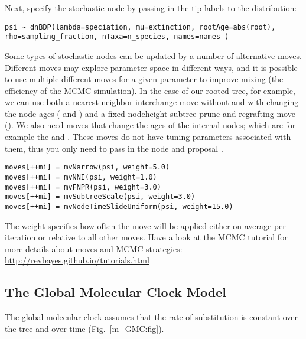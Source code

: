 Next, specify the  stochastic node by passing in the tip labels  to the  distribution:
{\tt \begin{snugshade*}
\begin{lstlisting}
psi ~ dnBDP(lambda=speciation, mu=extinction, rootAge=abs(root), rho=sampling_fraction, nTaxa=n_species, names=names )
\end{lstlisting}
\end{snugshade*}}

Some types of stochastic nodes can be updated by a number of alternative moves. 
Different moves may explore parameter space in different ways, and it is possible to use multiple different moves for a given parameter to improve mixing (the efficiency of the MCMC simulation). 
In the case of our rooted tree, for example, we can use both a nearest-neighbor interchange move without and with changing the node ages ( and ) and a fixed-nodeheight subtree-prune and regrafting move (). 
We also need moves that change the ages of the internal nodes; which are for example the  and .
These moves do not have tuning parameters associated with them, thus you only need to pass in the  node and proposal . 
{\tt \begin{snugshade*}
\begin{lstlisting}
moves[++mi] = mvNarrow(psi, weight=5.0)
moves[++mi] = mvNNI(psi, weight=1.0)
moves[++mi] = mvFNPR(psi, weight=3.0)
moves[++mi] = mvSubtreeScale(psi, weight=3.0)
moves[++mi] = mvNodeTimeSlideUniform(psi, weight=15.0)
\end{lstlisting}
\end{snugshade*}}
The weight specifies how often the move will be applied either on average per iteration or relative to all other moves.
Have a look at the MCMC tutorial for more details about moves and MCMC strategies: \href{http://revbayes.github.io/tutorials.html}{http://revbayes.github.io/tutorials.html}



\subsection{The Global Molecular Clock Model}\label{globalClockSec}

The global molecular clock assumes that the rate of substitution is constant over the tree and over time (Fig.~\ref{m_GMC:fig}).

